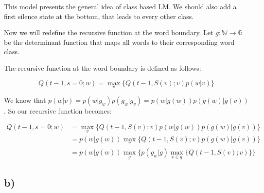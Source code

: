 
This model presents the general idea of class based LM. We should also add a first silence state at the bottom, 
that leads to every other class.

\newpage

Now we will redefine the recursive function at the word boundary. 
Let $g: \mathbb{W} \to \mathbb{G}$ be the determinant function that maps all words to their corresponding 
word class.

The recursive function at the word boundary is defined as follows: 

\[
Q(t-1,s=0;w) = \max_v\{Q(t-1,S(v);v)p(w|v)\}
\]

We know that $p(w|v) = p(w|g_w)p(g_w|g_v) = p(w|g(w))p(g(w)|g(v))$. So our recursive function becomes:

\begin{align*}
	Q(t-1,s=0;w) &= \max_v\{Q(t-1,S(v);v)p(w|g(w))p(g(w)|g(v))\} \\
	&= p(w|g(w))\max_v\{Q(t-1,S(v);v)p(g(w)|g(v))\} \\
	&= p(w|g(w))\max_g\{p(g_w|g)\max_{v \in g}\{Q(t-1,S(v);v)\}\}
\end{align*}


\subsection*{b)} %
\label{sub:b_}

